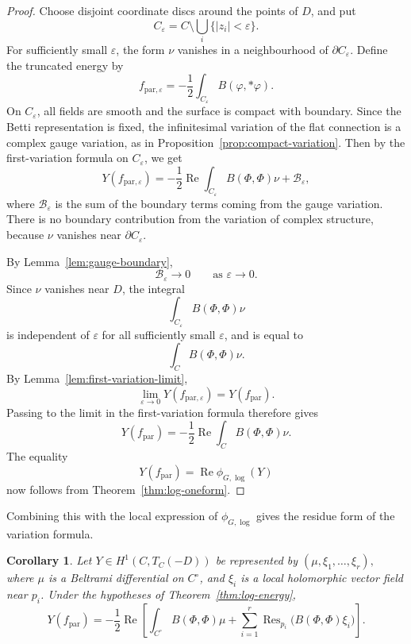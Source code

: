 \documentclass[11pt,reqno]{amsart}
\numberwithin{equation}{section}
\theoremstyle{plain}
\newtheorem{corollary}[theorem]{Corollary}
\theoremstyle{definition}
\theoremstyle{remark}
\begin{document}
\begin{proof}
Choose disjoint coordinate discs around the points of \(D\), and put
\[
        C_\varepsilon
        =
        C\setminus\bigcup_i\{|z_i|<\varepsilon\}.
\]
For sufficiently small \(\varepsilon\), the form \(\nu\) vanishes in a
neighbourhood of \(\partial C_\varepsilon\).  Define the truncated energy by
\[
        f_{\mathrm{par},\varepsilon}
        =
        -\frac12
        \int_{C_\varepsilon}B(\varphi,*\varphi).
\]
On \(C_\varepsilon\), all fields are smooth and the surface is compact with
boundary. Since the Betti representation is fixed, the infinitesimal variation
of the flat connection is a complex gauge variation, as in
Proposition~\ref{prop:compact-variation}. Then by the first-variation formula
on \(C_\varepsilon\), we get
\[
        Y(f_{\mathrm{par},\varepsilon})
        =
        -\frac12\operatorname{Re}
        \int_{C_\varepsilon}B(\Phi,\Phi)\nu
        +
        \mathcal B_\varepsilon,
\]
where \(\mathcal B_\varepsilon\) is the sum of the boundary terms coming from
the gauge variation. There is no boundary contribution from the variation of
complex structure, because \(\nu\) vanishes near \(\partial C_\varepsilon\).

By Lemma~\ref{lem:gauge-boundary},
\[
        \mathcal B_\varepsilon\longrightarrow0
        \qquad
        \text{as }\varepsilon\to0.
\]
Since \(\nu\) vanishes near \(D\), the integral
\[
        \int_{C_\varepsilon}B(\Phi,\Phi)\nu
\]
is independent of \(\varepsilon\) for all sufficiently small \(\varepsilon\), and
is equal to
\[
        \int_C B(\Phi,\Phi)\nu.
\]
By Lemma~\ref{lem:first-variation-limit},
\[
        \lim_{\varepsilon\to0}Y(f_{\mathrm{par},\varepsilon})
        =
        Y(f_{\mathrm{par}}).
\]
Passing to the limit in the first-variation formula therefore gives
\[
        Y(f_{\mathrm{par}})
        =
        -\frac12\operatorname{Re}
        \int_C B(\Phi,\Phi)\nu.
\]
The equality
\[
        Y(f_{\mathrm{par}})
        =
        \operatorname{Re}\phi_{G,\log}(Y)
\]
now follows from Theorem~\ref{thm:log-oneform}.
\end{proof}


Combining this with the local expression of
\(\phi_{G,\log}\) gives the residue form of the variation formula.

\begin{corollary}
\label{cor:log-energy-residue}
Let
\(
        Y\in H^1(C,T_C(-D))
\)
be represented by
\(
        (\mu,\xi_1,\ldots,\xi_r),
\)
where \(\mu\) is a Beltrami differential on \(C^\circ\), and \(\xi_i\) is a
local holomorphic vector field near \(p_i\). Under the hypotheses of
Theorem~\ref{thm:log-energy},
\[
        Y(f_{\mathrm{par}})
        =
        -\frac12\operatorname{Re}
        \left[
        \int_{C^\circ}B(\Phi,\Phi)\mu
        +
        \sum_{i=1}^{r}
        \operatorname{Res}_{p_i}
        \bigl(B(\Phi,\Phi)\xi_i\bigr)
        \right].
\]
\end{corollary}
\end{document}
